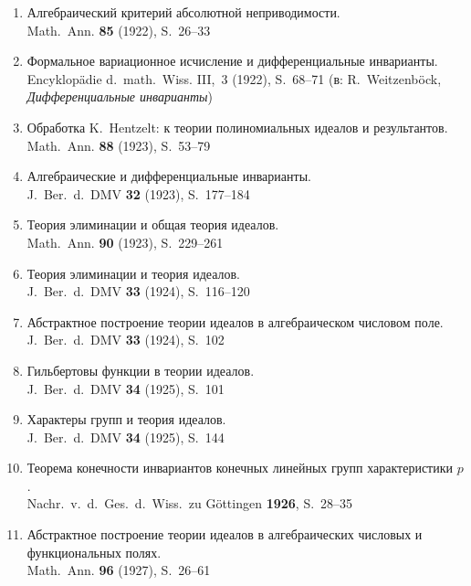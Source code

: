 \documentclass[11pt]{article}
\newcommand{\foreign}[1]{#1}
\begin{document}
\begin{enumerate}[label={\small\arabic*.},leftmargin=2em,itemsep=0.3em]
\item Алгебраический критерий абсолютной неприводимости.\\
\foreign{Math.\ Ann.} \textbf{85} (1922), S.~26--33

\item Формальное вариационное исчисление и дифференциальные инварианты.\\
\foreign{Encyklopädie d.\ math.\ Wiss.} III,\ 3 (1922), S.~68--71 (в:
R.\ Weitzenböck, \textit{Дифференциальные инварианты})

\item Обработка K.\ Hentzelt: к теории полиномиальных идеалов и результантов.\\
\foreign{Math.\ Ann.} \textbf{88} (1923), S.~53--79

\item Алгебраические и дифференциальные инварианты.\\
\foreign{J.\ Ber.\ d.\ DMV} \textbf{32} (1923), S.~177--184

\item Теория элиминации и общая теория идеалов.\\
\foreign{Math.\ Ann.} \textbf{90} (1923), S.~229--261

\item Теория элиминации и теория идеалов.\\
\foreign{J.\ Ber.\ d.\ DMV} \textbf{33} (1924), S.~116--120

\item Абстрактное построение теории идеалов в алгебраическом числовом поле.\\
\foreign{J.\ Ber.\ d.\ DMV} \textbf{33} (1924), S.~102

\item Гильбертовы функции в теории идеалов.\\
\foreign{J.\ Ber.\ d.\ DMV} \textbf{34} (1925), S.~101

\item Характеры групп и теория идеалов.\\
\foreign{J.\ Ber.\ d.\ DMV} \textbf{34} (1925), S.~144

\item Теорема конечности инвариантов конечных линейных групп характеристики $p$.\\
\foreign{Nachr.\ v.\ d.\ Ges.\ d.\ Wiss.\ zu Göttingen} \textbf{1926}, S.~28--35

\item Абстрактное построение теории идеалов в алгебраических числовых и функциональных полях.\\
\foreign{Math.\ Ann.} \textbf{96} (1927), S.~26--61


\end{enumerate}
\end{document}
